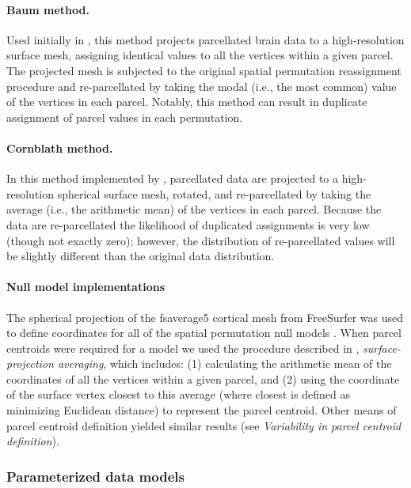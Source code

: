 \documentclass[12pt,aps,pra,reprint,showkeys]{revtex4-1}
\begin{document}
\paragraph*{Baum method.}

Used initially in \citet{baum2020pnas}, this method projects parcellated brain data to a high-resolution surface mesh, assigning identical values to all the vertices within a given parcel.
The projected mesh is subjected to the original spatial permutation reassignment procedure and re-parcellated by taking the modal (i.e., the most common) value of the vertices in each parcel.
Notably, this method can result in duplicate assignment of parcel values in each permutation.

\paragraph*{Cornblath method.}

In this method implemented by \citet{cornblath2019arxiv}, parcellated data are projected to a high-resolution spherical surface mesh, rotated, and re-parcellated by taking the average (i.e., the arithmetic mean) of the vertices in each parcel.
Because the data are re-parcellated the likelihood of duplicated assignments is very low (though not exactly zero); however, the distribution of re-parcellated values will be slightly different than the original data distribution.

\paragraph*{Null model implementations}

The spherical projection of the fsaverage5 cortical mesh from FreeSurfer was used to define coordinates for all of the spatial permutation null models \citep{fischl1999humanbrainmap}.
When parcel centroids were required for a model we used the procedure described in \citet{vazquezrodriguez2019pnas}, \textit{surface-projection averaging}, which includes: (1) calculating the arithmetic mean of the coordinates of all the vertices within a given parcel, and (2) using the coordinate of the surface vertex closest to this average (where closest is defined as minimizing Euclidean distance) to represent the parcel centroid.
Other means of parcel centroid definition yielded similar results (see \textit{Variability in parcel centroid definition}).

\subsubsection*{Parameterized data models}
\end{document}
